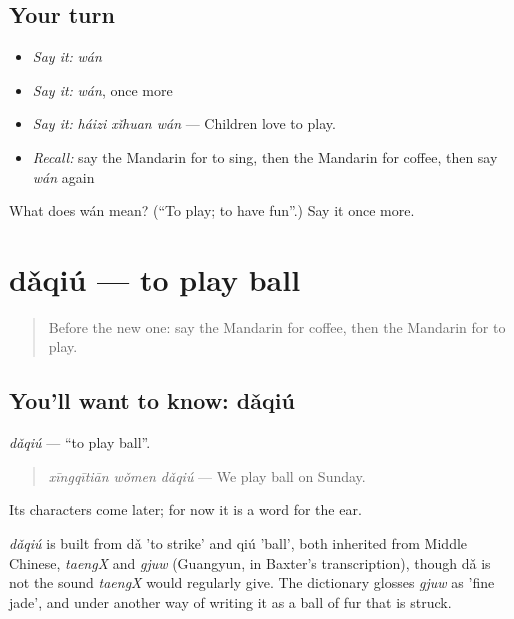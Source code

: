 \subsection*{Your turn}
\begin{itemize}
\raggedright
  \item \emph{Say it:} \emph{wán}
  \item \emph{Say it:} \emph{wán}, once more
  \item \emph{Say it:} \emph{háizi xǐhuan wán} — Children love to play.
  \item \emph{Recall:} say the Mandarin for to sing, then the Mandarin for coffee, then say \emph{wán} again
\end{itemize}

\begin{tcolorbox}[breakable,colback=teal!4,colframe=teal!35!black,title={Before you move on}]
What does wán mean? (\textquotedblleft{}To play; to have fun\textquotedblright{}.) Say it once more.
\end{tcolorbox}
\section[dǎqiú]{dǎqiú — to play ball}

\label{lesson:ZH-C56-daqiu}



\begin{quote}
Before the new one: say the Mandarin for coffee, then the Mandarin for to play.
\end{quote}

\subsection*{You'll want to know: dǎqiú}
\emph{dǎqiú} — \textquotedblleft{}to play ball\textquotedblright{}.

\begin{quote}
\emph{xīngqītiān wǒmen dǎqiú} — We play ball on Sunday.
\end{quote}

Its characters come later; for now it is a word for the ear.

\begin{cousinweb}
\emph{dǎqiú} is built from dǎ 'to strike' and qiú 'ball', both inherited from Middle Chinese, \emph{taengX} and \emph{gjuw} (Guangyun, in Baxter's transcription), though dǎ is not the sound \emph{taengX} would regularly give. The dictionary glosses \emph{gjuw} as 'fine jade', and under another way of writing it as a ball of fur that is struck.
\end{cousinweb}

